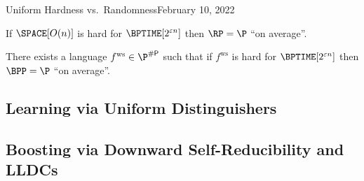 \begin{lecture}{4}{Uniform Hardness vs.\ Randomness}{February 10, 2022}
\begin{theorem}
	If
	$\SPACE\brac{O(n)}$ is hard for $\BPTIME\brac{2^{\eps n}}$
	then
	$\RP = \P$ ``on average''.
\end{theorem}

\newcommand{\fws}{\ensuremath{ f^{\text{ws}} }}
\begin{theorem}
	There exists a language $\fws \in \P^{\sharpp}$ such that if $\fws$
	is hard for $\BPTIME\brac{2^{\eps n}}$ then
	$\BPP = \P$ ``on average''.
\end{theorem}

\subsection{Learning via Uniform Distinguishers}

\subsection{Boosting via Downward Self-Reducibility and LLDCs}

\end{lecture}
